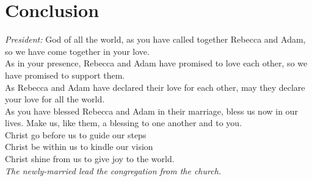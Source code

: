 \documentclass[a4paper,10pt,titlepage]{article}
\begin{document}
\clearpage
\section{Conclusion}

{\em President:} God of all the world, as you have called together Rebecca and Adam, so we have come together in your love.\\
 
As in your presence, Rebecca and Adam have promised to love each other, so we have promised to support them.\\

As Rebecca and Adam have declared their love for each other, may they declare your love for all the world.\\

As you have blessed Rebecca and Adam in their marriage, bless us now in our lives.
Make us, like them, a blessing to one another and to you. \\

Christ go before us to guide our steps  \\
Christ be within us to kindle our vision  \\
Christ shine from us to give joy to the world.  \\

{\em The newly-married lead the congregation from the church.}



\clearpage 
\end{document}

